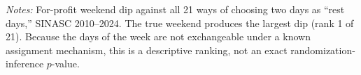 \begin{table}[H]\centering
\caption{\textbf{Descriptive ranking of the weekend against all two-day placebo pairs}}
\label{tab:placebo_ranking}
\small
\small\setlength{\tabcolsep}{4pt}
\begin{minipage}{\linewidth}\footnotesize
\textit{Notes:} For-profit weekend dip against all 21 ways of choosing two days as ``rest days,'' SINASC 2010--2024. The true weekend produces the largest dip (rank 1 of 21). Because the days of the week are not exchangeable under a known assignment mechanism, this is a descriptive ranking, not an exact randomization-inference $p$-value.
\end{minipage}
\end{table}
